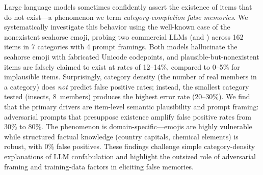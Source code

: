 Large language models sometimes confidently assert the existence of items that do not exist---a phenomenon we term \emph{category-completion false memories}.
We systematically investigate this behavior using the well-known case of the nonexistent seahorse emoji, probing two commercial LLMs (\gptfull and \gptmini) across 162 items in 7 categories with 4 prompt framings.
Both models hallucinate the seahorse emoji with fabricated Unicode codepoints, and plausible-but-nonexistent items are falsely claimed to exist at rates of 12--14\%, compared to 0--5\% for implausible items.
Surprisingly, category density (the number of real members in a category) does \emph{not} predict false positive rates; instead, the smallest category tested (insects, 8~members) produces the highest error rate (20--30\%).
We find that the primary drivers are item-level semantic plausibility and prompt framing: adversarial prompts that presuppose existence amplify false positive rates from 30\% to 80\%.
The phenomenon is domain-specific---emojis are highly vulnerable while structured factual knowledge (country capitals, chemical elements) is robust, with 0\% false positives.
These findings challenge simple category-density explanations of LLM confabulation and highlight the outsized role of adversarial framing and training-data factors in eliciting false memories.